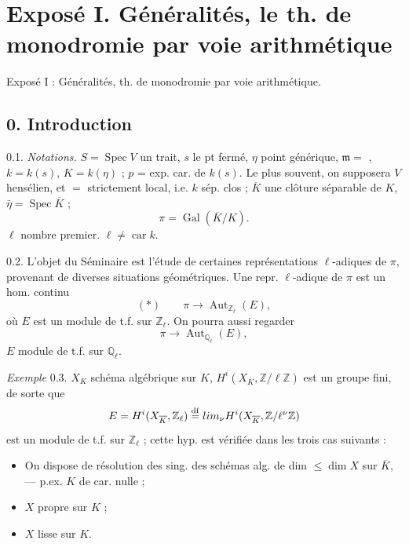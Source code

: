 \documentclass[11pt,a4paper]{article}
\begin{document}
\section{Exposé I. Généralités, le th. de monodromie par voie arithmétique}


Exposé I  : Généralités,  th. de monodromie par voie arithmétique.

\subsection*{0. Introduction}

0.1. \emph{Notations.} $S = \operatorname{Spec} V$ un trait, $s$ le pt fermé, $\eta$ point générique,
$\mathfrak{m} = {}$ , $k = k(s)$, $K = k(\eta)$ ; $p$ = exp. car. de $k(s)$.
Le plus souvent, on supposera \add{\ill{}} $V$ hensélien, et ${}={}$  strictement local, i.e. $k$ sép. clos ;
 $\overline{K}$ une clôture séparable de $K$, $\bar\eta = \operatorname{Spec}\overline{K}$ ;
\[
  \pi = \operatorname{Gal}(\overline{K}/K) .
\]
$\ell$ nombre premier.   \ill{}  $\ell \neq \operatorname{car} k$.

0.2. L'objet du Séminaire est l'étude de certaines représentations $\ell$-adiques de $\pi$, provenant de diverses situations géométriques. Une repr. $\ell$-adique de $\pi$ est un \struck{\ill{}} hom. continu
\[
  (*) \qquad \pi \longrightarrow \operatorname{Aut}_{\mathbb{Z}_\ell}(E) ,
\]
où $E$ est un module de t.f. sur $\mathbb{Z}_\ell$. On pourra aussi regarder
\[
  \pi \longrightarrow \operatorname{Aut}_{\mathbb{Q}_\ell}(E) ,
\]
$E$ module de t.f. sur $\mathbb{Q}_\ell$.

\emph{Exemple} 0.3. $X_K$ schéma algébrique sur $K$,   $H^i(X_{\overline{K}}, \mathbb{Z}/\ell\mathbb{Z})$ est un groupe fini, de sorte que
\[
  E = H^i(X_{\overline{K}}, \mathbb{Z}_\ell) \overset{\mathrm{df}}{=} \varprojlim_\nu H^i(X_{\overline{K}}, \mathbb{Z}/\ell^\nu\mathbb{Z})
\]
est un module de t.f. sur $\mathbb{Z}_\ell$ ; cette hyp. \struck{\ill{}} est \struck{\ill{}} vérifiée dans les trois cas suivants :
\begin{itemize}
  \item[a)] On dispose de résolution des sing.  des schémas alg. de dim ${}\leq \dim X$ sur $\overline{K}$, --- p.ex. $K$ de car. nulle ;
  \item[b)] $X$ propre sur $K$ ;
  \item[c)] $X$ lisse sur $K$.
\end{itemize}
\end{document}
